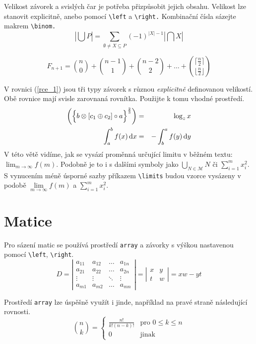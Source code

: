 \documentclass[twocolumn, 11pt, a4paper]{article}
\theoremstyle{definition}
\theoremstyle{plain}
\begin{document}
    Velikost závorek a svislých čar je potřeba přizpůsobit jejich obsahu. Velikost lze stanovit explicitně, anebo pomocí \verb|\left| a \verb|\right.| Kombinační čísla sázejte makrem \verb|\binom.|
    $$
        \left|\bigcup P\right| = \sum\limits _{\emptyset \neq X \subseteq P} (-1)^{|X|-1}\left|\bigcap X\right|
    $$

    $$
        F_{n+1} = \binom{n}{0} + \binom{n - 1}{1} + \binom{n - 2}{2} + \dots + \binom{\lceil \frac{n}{2} \rceil}{\lfloor \frac{n}{2} \rfloor}
    $$

    V rovnici (\ref{rce_1}) jsou tři typy závorek s různou \emph{explicitně} definovanou velikostí. Obě rovnice mají svisle zarovnaná rovnítka. Použijte k tomu vhodné prostředí.
    \begin{eqnarray}
        \label{rce_1}
        \biggl(\Bigl\{ b \otimes [c_1 \oplus c_2] \circ a\Bigr\}^{\frac{2}{3}}\biggl) & = & \log_zx \\
        \label{rce_2}
        \int_a^b f(x)\,\mathrm{d}x & = & -\int_b^a f(y)\,\mathrm{d}y
    \end{eqnarray}
    \noindent
    V této větě vidíme, jak se vysází proměnná určující limitu v běžném textu: $\lim_{m\rightarrow \infty}f(m)$. Podobně je to i s dalšími symboly jako $\bigcup_{N \in \mathcal{M}}N$ či $\sum _{i=1}^m x^2_i$. S vynucením méně úsporné sazby příkazem \verb|\limits| budou vzorce vysázeny v podobě $\lim\limits_{m\rightarrow \infty}f(m)$ a $\sum\limits _{i=1}^m x^2_i$.
    
    \section{Matice}
    Pro sázení matic se používá prostředí \texttt{array} a závorky s výškou nastavenou pomocí \verb|\left|, \verb|\right|.
    $$
        D = \left|
        \begin{array}{cccc}
            a_{11} & a_{12} & \ldots & a_{1n} \\
            a_{21} & a_{22} & \ldots & a_{2n} \\
            \vdots & \vdots & \ddots & \vdots \\
            a_{m1} & a_{m2} & \ldots & a_{mn}
        \end{array}
        \right|
        =
        \left|
        \begin{array}{cc}
            x & y \\
            t & w
        \end{array}
        \right|
        = xw - yt
    $$

    Prostředí \texttt{array} lze úspěšně využít i jinde, například na pravé straně následující rovnosti.
    $$
        \binom{n}{k} = \left\{\begin{array}{ll}
             \frac{n!}{k!(n-k)!} & \text{pro } 0 \leq k \leq n \\
             0 & \text{jinak}
        \end{array} \right.
    $$
\end{document}
